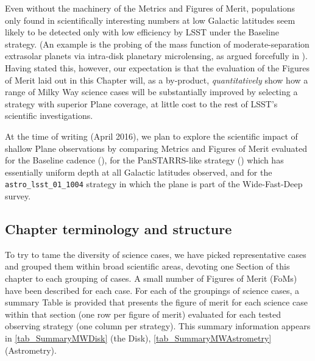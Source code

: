 Even without the machinery of the Metrics and Figures of Merit,
populations only found in scientifically interesting numbers at low
Galactic latitudes seem likely to be detected only with low efficiency
by LSST under the Baseline strategy. (An example is the probing of the
mass function of moderate-separation extrasolar planets via intra-disk
planetary microlensing, as argued forcefully in \citet{gould13}). Having
stated this, however, our expectation is that the evaluation of the
Figures of Merit laid out in this Chapter will, as a by-product, {\it
quantitatively} show how a range of Milky Way science cases will be
substantially improved by selecting a strategy with superior Plane
coverage, at little cost to the rest of LSST's scientific
investigations.

At the time of writing (April 2016), we plan to explore the scientific
impact of shallow Plane observations by comparing Metrics and Figures of
Merit evaluated for the Baseline cadence (),
for the PanSTARRS-like strategy () which has
essentially uniform depth at all Galactic latitudes observed, and for
the {\tt astro\_lsst\_01\_1004} strategy in which the plane is part of
the Wide-Fast-Deep survey.


\subsection{Chapter terminology and structure}

To try to tame the diversity of science cases, we have picked
representative cases and grouped them within broad scientific areas,
devoting one Section of this chapter to each grouping of cases. A small
number of Figures of Merit (FoMs) have been described for each case. For
each of the groupings of science cases, a summary Table is provided that
presents the figure of merit for each science case within that section
(one row per figure of merit) evaluated for each tested observing
strategy (one column per strategy). This summary information appears in
\autoref{tab_SummaryMWDisk} (the Disk),
\autoref{tab_SummaryMWAstrometry} (Astrometry).

